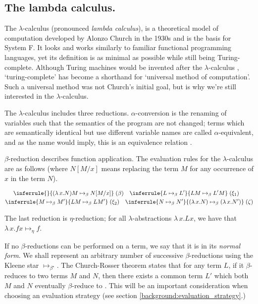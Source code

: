 \subsection{The lambda calculus.}
The $\lambda$-calculus (pronounced \textit{lambda calculus}), is a theoretical model of computation
developed by Alonzo Church in the 1930s \citep{church_set_1932} and is the basis for System F. It
looks and works similarly to familiar functional programming languages, yet its definition is as
minimal as possible while still being Turing-complete. Although Turing machines would be invented
after the $\lambda$-calculus \citep{turing_computable_1937}, `turing-complete' has become a
shorthand for `universal method of computation'. Such a universal method was not Church's initial
goal, but is why we're still interested in the $\lambda$-calculus.

The $\lambda$-calculus includes three reductions. $\alpha$-conversion is the renaming of variables
such that the semantics of the program are not changed; terms which are semantically identical but
use different variable names are called $\alpha$-equivalent, and as the name would imply, this is an
equivalence relation \citep{pierce_types_2002}.

$\beta$-reduction describes function application. The evaluation rules for the $\lambda$-calculus
are as follows \citep{wadler_programming_2022} (where $N[M/x]$ means replacing the term $M$ for any occurrence of $x$ in the term $N$).

\begin{equation}
\label{equation:untyped_beta_rules}
\begin{gathered}
  \inferrule{ }{(\lambda \, x. N)M \mapsto_{\beta} N[M/x]} \; (\beta) \quad
  \inferrule{L \mapsto_{\beta} L'}{LM \mapsto_{\beta} L'M} \; (\xi_1) \quad\\
  \inferrule{M \mapsto_{\beta} M'}{LM \mapsto_{\beta} LM'} \; (\xi_2) \quad
  \inferrule
    {N \mapsto_{\beta} N'}
    {(\lambda \, x. N) \mapsto_{\beta} (\lambda \, x. N')} \; (\zeta)
\end{gathered}
\end{equation}

The last reduction is $\eta$-reduction; for all $\lambda$-abstractions $\lambda \, x. L x$, we have
that $\lambda \, x. f x \mapsto_{\eta} f$.

If no $\beta$-reductions can be performed on a term, we say that it is in its \textit{normal form}.
We shall represent an arbitrary number of successive $\beta$-reductions using the Kleene star
$\mapsto_{\beta^{\star}}$. The Church-Rosser theorem states that for any term $L$, if it
$\beta$-reduces to two terms $M$ and $N$, then there exists a common term $L'$ which both $M$ and
$N$ eventually $\beta$-reduce to \citep{church_properties_1936}. This will be an important
consideration when choosing an evaluation strategy (see section
\ref{background:evaluation_strategy}.)


